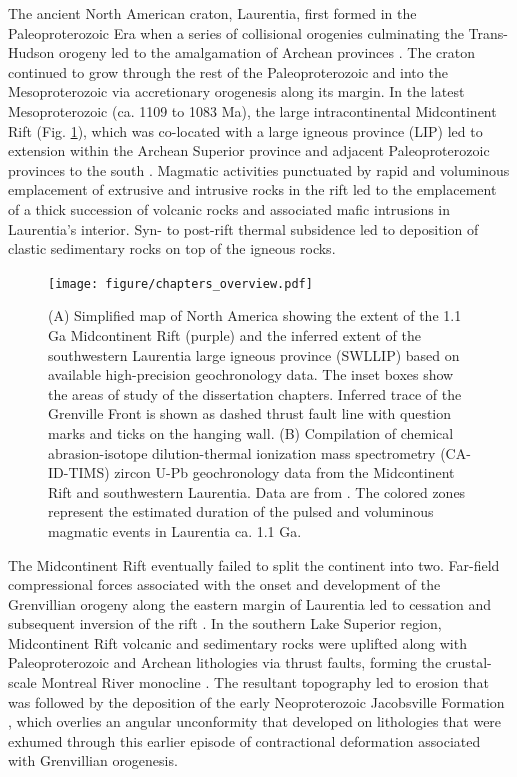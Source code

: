 The ancient North American craton, Laurentia, first formed in the Paleoproterozoic Era when a series of collisional orogenies culminating the Trans-Hudson orogeny led to the amalgamation of Archean provinces \citep{Hoffman1988a, Whitmeyer2007a}. The craton continued to grow through the rest of the Paleoproterozoic and into the Mesoproterozoic via accretionary orogenesis along its margin. In the latest Mesoproterozoic (ca. 1109 to 1083 Ma), the large intracontinental Midcontinent Rift (Fig. \ref{fig:abstract_overview}), which was co-located with a large igneous province (LIP) \citep{Swanson-Hysell2021a} led to extension within the Archean Superior province and adjacent Paleoproterozoic provinces to the south \citep{Cannon1992a}. Magmatic activities punctuated by rapid and voluminous emplacement of extrusive and intrusive rocks in the rift led to the emplacement of a thick succession of volcanic rocks and associated mafic intrusions in Laurentia’s interior. Syn- to post-rift thermal subsidence led to deposition of clastic sedimentary rocks on top of the igneous rocks.

\begin{figure}[h!]
    \centering
    \texttt{[image: figure/chapters\_overview.pdf]}
    \caption[Overview of thesis study area and geochronology data]{(A) Simplified map of North America showing the extent of the 1.1 Ga Midcontinent Rift (purple) and the inferred extent of the southwestern Laurentia large igneous province (SWLLIP) based on available high-precision geochronology data. The inset boxes show the areas of study of the dissertation chapters. Inferred trace of the Grenville Front is shown as dashed thrust fault line with question marks and ticks on the hanging wall. (B) Compilation of chemical abrasion-isotope dilution-thermal ionization mass spectrometry (CA-ID-TIMS) zircon U-Pb geochronology data from the Midcontinent Rift and southwestern Laurentia. Data are from \cite{Fairchild2017a, Swanson-Hysell2014a, Swanson-Hysell2019a, Mohr2024a}. The colored zones represent the estimated duration of the pulsed and voluminous magmatic events in Laurentia ca. 1.1 Ga.}
    \label{fig:abstract_overview}
\end{figure}

The Midcontinent Rift eventually failed to split the continent into two. Far-field compressional forces associated with the onset and development of the Grenvillian orogeny along the eastern margin of Laurentia led to cessation and subsequent inversion of the rift \citep{Cannon1993a, Swanson-Hysell2019a}. In the southern Lake Superior region, Midcontinent Rift volcanic and sedimentary rocks were uplifted along with Paleoproterozoic and Archean lithologies via thrust faults, forming the crustal-scale Montreal River monocline \citep{Cannon1993a}. The resultant topography led to erosion that was followed by the deposition of the early Neoproterozoic Jacobsville Formation \citep{Hamblin1958a, Kalliokoski1982a, Hodgin2022a}, which overlies an angular unconformity that developed on lithologies that were exhumed through this earlier episode of contractional deformation associated with Grenvillian orogenesis. 

